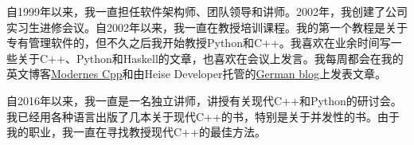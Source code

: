 自1999年以来，我一直担任软件架构师、团队领导和讲师。2002年，我创建了公司实习生进修会议。自2002年以来，我一直在教授培训课程。我的第一个教程是关于专有管理软件的，但不久之后我开始教授Python和C++。我喜欢在业余时间写一些关于C++、Python和Haskell的文章，也喜欢在会议上发言。我每周都会在我的英文博客\href{https://www.modernescpp.com/}{Modernes Cpp}和由Heise Developer托管的\href{https://www.grimm-jaud.de/index.php/blog}{German blog}上发表文章。

自2016年以来，我一直是一名独立讲师，讲授有关现代C++和Python的研讨会。我已经用各种语言出版了几本关于现代C++的书，特别是关于并发性的书。由于我的职业，我一直在寻找教授现代C++的最佳方法。

